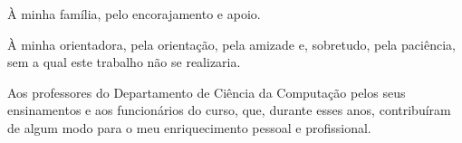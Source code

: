 \indent À minha família, pelo encorajamento e apoio.

À minha orientadora, pela orientação, pela amizade e, sobretudo, pela paciência, sem a qual este trabalho não se realizaria.

Aos professores do Departamento de Ciência da Computação pelos seus ensinamentos e aos funcionários do curso, que, durante esses anos, contribuíram de algum modo para o meu enriquecimento pessoal e profissional.
